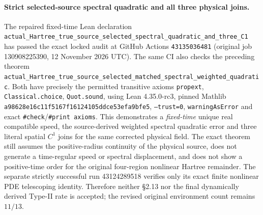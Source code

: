 \documentclass[11pt]{amsart}
\begin{document}
\paragraph{Strict selected-source spectral quadratic and all three physical joins.}
The repaired fixed-time Lean declaration
\texttt{actual\_Hartree\_true\_source\_selected\_spectral\_quadratic\_and\_three\_C1}
has passed the exact locked audit at GitHub Actions
\texttt{43135036481}
(original job 130908225390, 12 November 2026 UTC). The same CI also
checks the preceding theorem
\texttt{actual\_Hartree\_true\_source\_selected\_matched\_spectral\_weighted\_quadratic}.
Both have precisely the permitted transitive axioms
\texttt{propext}, \texttt{Classical.choice}, \texttt{Quot.sound},
using Lean 4.35.0-rc3, pinned Mathlib
\texttt{a98628e16c11f5167f16124105ddce53efa9bfe5},
\texttt{--trust=0}, \texttt{warningAsError} and exact
\texttt{\#check}/\texttt{\#print axioms}.
This demonstrates a \emph{fixed-time} unique real compatible speed,
the source-derived weighted spectral quadratic error and three literal
spatial \(C^1\) joins for the same corrected physical field.
The exact theorem still assumes the positive-radius continuity of the
physical source, does not generate a time-regular speed or spectral
displacement, and does not show a positive-time order for the original
four-region nonlinear Hartree remainder. The separate strictly successful
run 43124289518 verifies only its exact finite nonlinear PDE telescoping
identity. Therefore neither \S2.13 nor the final dynamically derived
Type-II rate is accepted; the revised original environment count
remains \(11/13\).


 {}
 {}


 {}
 {}
\end{document}
